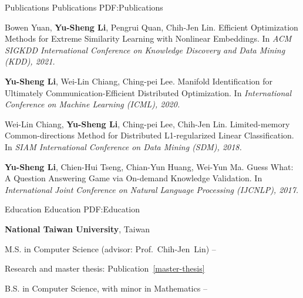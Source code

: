 \documentclass[letterpaper,MMMyyyy,nonstopmode]{simpleresumecv}
\begin{document}
\begin{Body}
\BigGap

\Section
{Publications}
{Publications}
{PDF:Publications}

\begin{enumerate}[label={[\arabic*]}]
\item\quad \label{master-thesis}
Bowen Yuan, \textbf{Yu-Sheng Li}, Pengrui Quan, Chih-Jen Lin. Efficient Optimization Methods for Extreme Similarity Learning with Nonlinear Embeddings.
In \textit{ACM SIGKDD International Conference on Knowledge Discovery and Data Mining (KDD), 2021.}

\Gap

\item\quad
\textbf{Yu-Sheng Li}, Wei-Lin Chiang, Ching-pei Lee. Manifold Identification for Ultimately Communication-Efficient Distributed Optimization.
In \textit{International Conference on Machine Learning (ICML), 2020.}

\Gap

\item\quad \label{alibaba-paper}
Wei-Lin Chiang, \textbf{Yu-Sheng Li}, Ching-pei Lee, Chih-Jen Lin. Limited-memory Common-directions Method for Distributed L1-regularized Linear Classification.
In \textit{SIAM International Conference on Data Mining (SDM), 2018.}

\Gap

\item\quad
\textbf{Yu-Sheng Li}, Chien-Hui Tseng, Chian-Yun Huang, Wei-Yun Ma.
Guess What: A Question Answering Game via On-demand Knowledge Validation.
In \textit{International Joint Conference on Natural Language Processing (IJCNLP), 2017.}

\end{enumerate}



\BigGap

\Section
{Education}
{Education}
{PDF:Education}

\Entry
\textbf{National Taiwan University},
Taiwan

\Gap
\BulletItem
M.S. in Computer Science (advisor: Prof.~Chih-Jen~Lin)
\hfill
{} -- 


\Gap
\SubBulletItem
Research and master thesis: Publication~\ref{master-thesis}

\Gap
\BulletItem
B.S. in Computer Science, with minor in Mathematics
\hfill
{} -- 


\end{Body}
\end{document}
